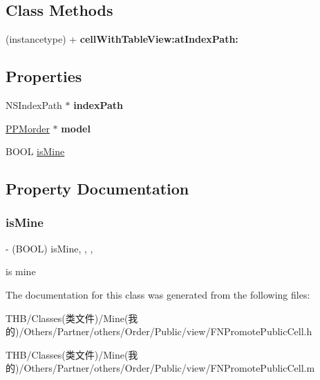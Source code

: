 \subsection*{Class Methods}
\begin{DoxyCompactItemize}
\item 
\mbox{\label{interface_f_n_promote_public_cell_acc4b40a2e3e221c1e29fa3d8cfb3cdf8}} 
(instancetype) + {\bfseries cell\+With\+Table\+View\+:at\+Index\+Path\+:}
\end{DoxyCompactItemize}
\subsection*{Properties}
\begin{DoxyCompactItemize}
\item 
\mbox{\label{interface_f_n_promote_public_cell_a103d22c5f73f4bb0016f0607bb50f5d0}} 
N\+S\+Index\+Path $\ast$ {\bfseries index\+Path}
\item 
\mbox{\label{interface_f_n_promote_public_cell_a3fd8059e408386dcc8862c09bf5ea15f}} 
\mbox{\hyperlink{interface_p_p_morder}{P\+P\+Morder}} $\ast$ {\bfseries model}
\item 
B\+O\+OL \mbox{\hyperlink{interface_f_n_promote_public_cell_aaf9e5685ceff3e4bea63b093f77fdadc}{is\+Mine}}
\end{DoxyCompactItemize}


\subsection{Property Documentation}
\mbox{\label{interface_f_n_promote_public_cell_aaf9e5685ceff3e4bea63b093f77fdadc}} 
\subsubsection{\texorpdfstring{is\+Mine}{isMine}}
{\footnotesize\ttfamily -\/ (B\+O\+OL) is\+Mine\hspace{0.3cm}{\ttfamily [read]}, {\ttfamily [write]}, {\ttfamily [nonatomic]}, {\ttfamily [assign]}}

is mine 

The documentation for this class was generated from the following files\+:\begin{DoxyCompactItemize}
\item 
T\+H\+B/\+Classes(类文件)/\+Mine(我的)/\+Others/\+Partner/others/\+Order/\+Public/view/F\+N\+Promote\+Public\+Cell.\+h\item 
T\+H\+B/\+Classes(类文件)/\+Mine(我的)/\+Others/\+Partner/others/\+Order/\+Public/view/F\+N\+Promote\+Public\+Cell.\+m\end{DoxyCompactItemize}
